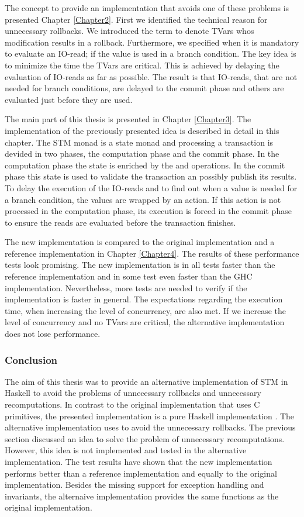 The concept to provide an implementation that avoids one of these problems is presented Chapter \ref{Chapter2}.
First we identified the technical reason for unnecessary rollbacks. We introduced the term
 to denote TVars whos modification results in a rollback. Furthermore, we 
specified when it is mandatory to evaluate an IO-read; if the value is used in a branch condition.
The key idea is to minimize the time the TVars are critical. This is achieved by delaying the 
evaluation of IO-reads as far as possible. The result is that IO-reads, that are not needed for branch 
conditions, are delayed to the commit phase and others are evaluated just before they are used.

The main part of this thesis is presented in Chapter \ref{Chapter3}. The implementation of the previously 
presented idea is described in detail in this chapter. The STM monad is a state monad and processing a
transaction is devided in two phases, the computation phase and the commit phase. In the computation
phase the state is enriched by the  and  operations. In the commit phase 
this state is used to validate the transaction an possibly publish its results. To delay the execution 
of the IO-reads and to find out when a value is needed for a branch condition, the values are wrapped 
by an  action. If this action is not processed in the computation phase, its 
execution is forced in the commit phase to ensure the reads are evaluated before the transaction 
finishes. 

The new implementation is compared to the original implementation and a reference implementation in
Chapter \ref{Chapter4}. The results of these performance tests look promising. The new implementation
is in all tests faster than the reference implementation and in some test even faster than the GHC implementation.
Nevertheless, more tests are needed to verify if the implementation is faster in general. The expectations 
regarding the execution time, when increasing the level of concurrency, are also met. If we increase the 
level of concurrency and no TVars are critical, the alternative implementation does not lose performance.

\subsubsection{Conclusion}
The aim of this thesis was to provide an alternative implementation of STM in Haskell to avoid the 
problems of unnecessary rollbacks and unnecessary recomputations. In contrast to the original 
implementation that uses C primitives, the presented implementation is a pure Haskell implementation .
The alternative implementation uses  to avoid the unnecessary rollbacks. 
The previous section discussed an idea to solve the problem of unnecessary recomputations. However, 
this idea is not implemented and tested in the alternative implementation. The test results have 
shown that the new implementation performs better than a reference implementation and equally to 
the original implementation. Besides the missing support for exception handling and invariants, 
the alternaive implementation provides the same functions as the original implementation. 
